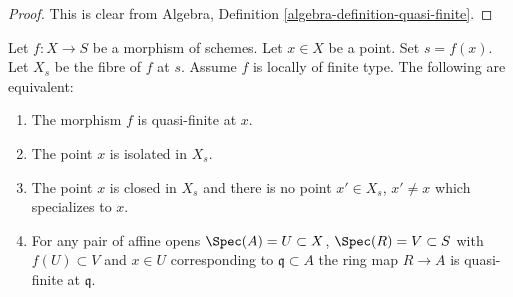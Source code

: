 \begin{proof}
This is clear from Algebra, Definition \ref{algebra-definition-quasi-finite}.
\end{proof}

\begin{lemma}
\label{lemma-quasi-finite-at-point-characterize}
Let $f : X \to S$ be a morphism of schemes.
Let $x \in X$ be a point. Set $s = f(x)$.
Let $X_s$ be the fibre of $f$ at $s$.
Assume $f$ is locally of finite type.
The following are equivalent:
\begin{enumerate}
\item The morphism $f$ is quasi-finite at $x$.
\item The point $x$ is isolated in $X_s$.
\item The point $x$ is closed in $X_s$
and there is no point $x' \in X_s$, $x' \not = x$
which specializes to $x$.
\item For any pair of affine opens
$\Spec(A) = U \subset X$, $\Spec(R) = V \subset S$ with
$f(U) \subset V$ and $x \in U$ corresponding to $\mathfrak q \subset A$
the ring map $R \to A$ is quasi-finite at $\mathfrak q$.
\end{enumerate}
\end{lemma}

